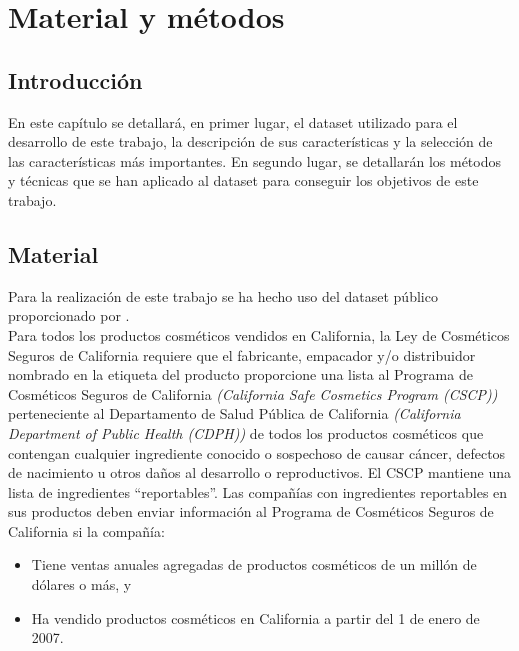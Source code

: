 
\chapter{Material y métodos} %
\label{chap:material-methods} %


\section{Introducción}

En este capítulo se detallará, en primer lugar, el dataset utilizado para el desarrollo de este trabajo, la descripción de sus características y la selección de las características más importantes. En segundo lugar, se detallarán los métodos y técnicas que se han aplicado al dataset para conseguir los objetivos de este trabajo.





\section{Material}
\label{sec:material}

Para la realización de este trabajo se ha hecho uso del dataset público  \citep{dataset} proporcionado por  \citep{healthdata}. \\

Para todos los productos cosméticos vendidos en California, la Ley de Cosméticos Seguros de California requiere que el fabricante, empacador y/o distribuidor nombrado en la etiqueta del producto proporcione una lista al Programa de Cosméticos Seguros de California \textit{(California Safe Cosmetics Program (CSCP))} perteneciente al Departamento de Salud Pública de California \textit{(California Department of Public Health (CDPH))} de todos los productos cosméticos que contengan cualquier ingrediente conocido o sospechoso de causar cáncer, defectos de nacimiento u otros daños al desarrollo o reproductivos. El CSCP mantiene una lista de ingredientes ``reportables''. Las compañías con ingredientes reportables en sus productos deben enviar información al Programa de Cosméticos Seguros de California si la compañía:

\begin{itemize}
 \item Tiene ventas anuales agregadas de productos cosméticos de un millón de dólares o más, y
 \item Ha vendido productos cosméticos en California a partir del 1 de enero de 2007.
\end{itemize}

